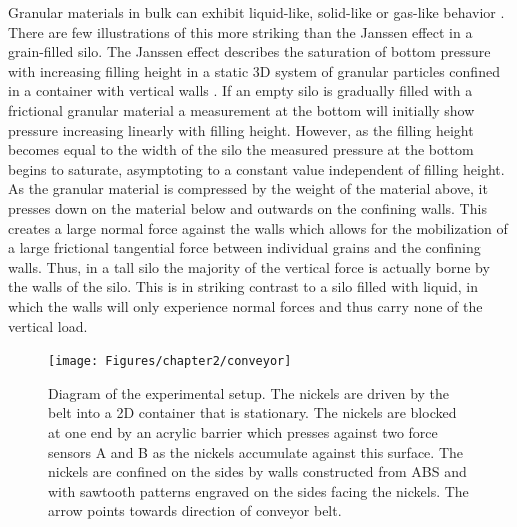 Granular materials in bulk can exhibit liquid-like, solid-like or gas-like behavior \cite{jaeger_physics_1992, jaeger_granular_1996, liu_nonlinear_1998, trappe_jamming_2001}. There are few illustrations of this more striking than the Janssen  effect in a grain-filled silo.  The Janssen effect describes the saturation of bottom pressure with increasing filling height in a static 3D system of granular particles confined in a container with vertical walls \cite{janssen_versuche_1895, duran_sands_2000, sperl_experiments_2006}. If an empty silo is gradually filled with a frictional granular material a measurement at the bottom will initially show pressure increasing linearly with filling height. However, as the filling height becomes equal to the width of the silo the measured pressure at the bottom begins to saturate, asymptoting to a constant value independent of filling height. As the granular material is compressed by the weight of the material above, it presses down on the material below and outwards on the confining walls. This creates a large normal force against the walls which allows for the mobilization of a large frictional tangential force between individual grains and the confining walls. Thus, in a tall silo the majority of the vertical force is actually borne by the walls of the silo. This is in striking contrast to a silo filled with liquid, in which the walls will only experience normal forces and thus carry none of the vertical load. 
%
\begin{figure}
	\texttt{[image: Figures/chapter2/conveyor]}
	\caption{Diagram of the experimental setup. The nickels are driven by the belt into a 2D container that is stationary. The nickels are blocked at one end by an acrylic barrier which presses against two force sensors A and B as the nickels accumulate against this surface. The nickels are confined on the sides by walls constructed from ABS and with sawtooth patterns engraved on the sides facing the nickels. The arrow points towards direction of conveyor belt.}
	\label{fig:conveyor}
\end{figure}
%

